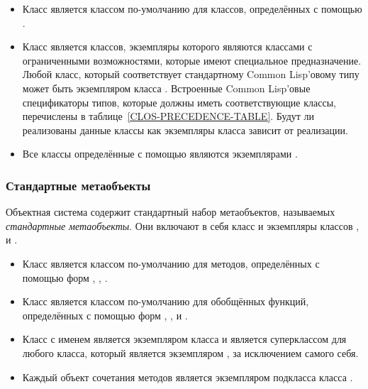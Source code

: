 \begin{itemize}

\item Класс  является классом по-умолчанию для классов,
  определённых с помощью .

\item Класс  является классов, экземпляры которого являются
  классами с ограниченными возможностями, которые имеют специальное
  предназначение. Любой класс, который соответствует стандартному Common
  Lisp'овому типу может быть экземпляром класса .
  Встроенные Common Lisp'овые спецификаторы типов, которые должны иметь
  соответствующие классы, перечислены в таблице~\ref{CLOS-PRECEDENCE-TABLE}.
  Будут ли реализованы данные классы как экземпляры класса 
  зависит от реализации.

\item Все классы определённые с помощью  являются экземплярами .
\end{itemize}

\subsubsection{Стандартные метаобъекты}

Объектная система содержит стандартный набор метаобъектов, называемых
\emph{стандартные метаобъекты}. Они включают в себя класс 
и экземпляры классов ,  и
.

\begin{itemize}

\item 
Класс  является классом по-умолчанию для методов,
определённых с помощью форм , , 
.

\item 
Класс  является классом по-умолчанию для
обобщённых функций, определённых с помощью форм ,
,  %
и .

\item 
Класс с именем  является экземпляром класса
 и является суперклассом для любого класса, который является
экземпляром , за исключением самого себя.

\item 
Каждый объект сочетания методов является экземпляром подкласса класса
.
\end{itemize}


